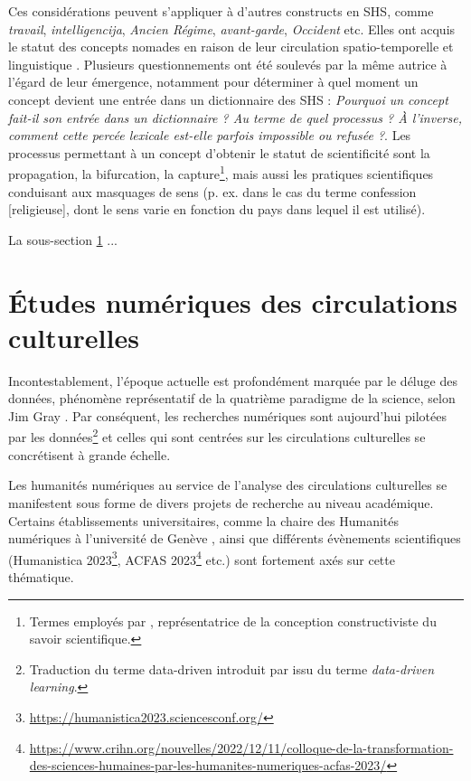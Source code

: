 Ces considérations peuvent s'appliquer à d'autres constructs en SHS, comme \textit{travail}, \textit{intelligencija}, \textit{Ancien Régime}, \textit{avant-garde}, \textit{Occident} etc. Elles ont acquis le statut des concepts \og{}nomades\fg{} en raison de leur circulation spatio-temporelle et linguistique \citep[p. 117]{ghermani2011}. Plusieurs questionnements ont été soulevés par la même autrice à l'égard de leur émergence, notamment pour déterminer à quel moment un concept devient une entrée dans un dictionnaire des \textsc{SHS} : \og{}\textit{Pourquoi un concept fait-il son entrée dans un dictionnaire ? Au terme de quel processus ? À l'inverse, comment cette percée lexicale est-elle parfois impossible ou refusée ?}\fg{}. Les processus permettant à un concept d'obtenir le statut de scientificité sont la propagation, la bifurcation, la capture\footnote{Termes employés par \citet{stengers1987d}, représentatrice de la conception constructiviste du savoir scientifique.}, mais aussi les pratiques scientifiques conduisant aux masquages de sens (p. ex. dans le cas du terme \og{}confession [religieuse]\fg{}, dont le sens varie en fonction du pays dans lequel il est utilisé).

La sous-section \ref{circulations_numeriques} ... 


\section{Études numériques des circulations culturelles}
\label{circulations_numeriques}
Incontestablement, l'époque actuelle est profondément marquée par le \og{}déluge des données\fg{}, phénomène représentatif de la quatrième paradigme de la science, selon Jim Gray \citep{hey2009jim}. Par conséquent, les recherches numériques sont aujourd'hui \og{}pilotées par les données\fg{}\footnote{Traduction du terme \og{}data-driven\fg{} introduit par \citep{Johns1991ShouldYB} issu du terme \textit{data-driven learning}.} et celles qui sont centrées sur les circulations culturelles se concrétisent à grande échelle.

Les humanités numériques au service de l'analyse des circulations culturelles se manifestent sous forme de divers projets de recherche au niveau académique. Certains établissements universitaires, comme la chaire des Humanités numériques à l'université de Genève \citep{joyeux2022circulations}, ainsi que différents évènements scientifiques  (Humanistica 2023\footnote{\url{https://humanistica2023.sciencesconf.org/}}, \textsc{ACFAS} 2023\footnote{\url{https://www.crihn.org/nouvelles/2022/12/11/colloque-de-la-transformation-des-sciences-humaines-par-les-humanites-numeriques-acfas-2023/}} etc.) sont fortement axés sur cette thématique.  

%
